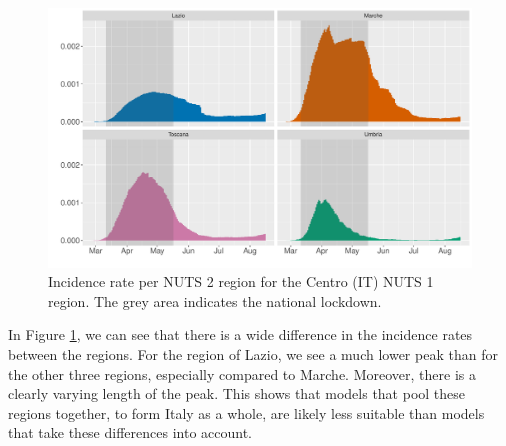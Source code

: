 \documentclass[12pt]{article}
\begin{document}
	
	
	\begin{figure}[H]
	    \centering
	    \includegraphics[width=0.94\linewidth]{output/infective_rates_Centro (IT).pdf}
	    \caption{Incidence rate per NUTS 2 region for the Centro (IT) NUTS 1 region. The grey area indicates the national lockdown.}
	    \label{fig:incidence_Centro}
	\end{figure}
	
	In Figure \ref{fig:incidence_Centro}, we can see that there is a wide difference in the incidence rates between the regions. For the region of Lazio, we see a much lower peak than for the other three regions, especially compared to Marche. Moreover, there is a clearly varying length of the peak. This shows that models that pool these regions together, to form Italy as a whole, are likely less suitable than models that take these differences into account.
	\\
	
	
\end{document}
